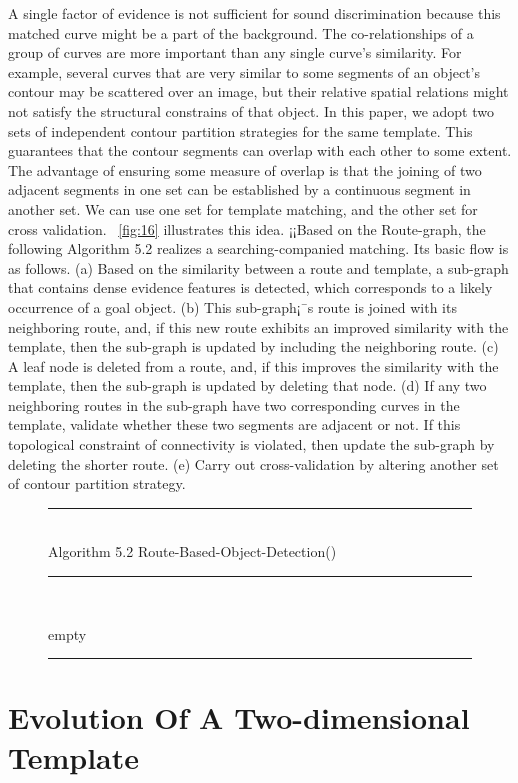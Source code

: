 \documentclass[journal]{IEEEtran}
\newenvironment{myalgorithm}[1]%
{\begin{figure}[!h]\small\noindent\rule{\linewidth}{1pt}\\#1\vspace{-0.5em}\\%
\rule{\linewidth}{0.5pt}\\\vspace{-1.5em}}%
{\vspace{-0.5em}\rule{\linewidth}{1pt}\end{figure}}
\begin{document}
A single factor of evidence is not sufficient for sound discrimination because this matched curve might be a part of the background. 
The co-relationships of a group of curves are more important than any single curve's similarity. 
For example, several curves that are very similar to some segments of an object's contour may be scattered over an image, but their relative spatial relations might not satisfy the structural constrains of that object. 
In this paper, we adopt two sets of independent contour partition strategies for the same template. This guarantees that the contour segments can overlap with each other to some extent. The advantage of ensuring some measure of overlap is that the joining of two adjacent segments in one set can be established by a continuous segment in another set.
We can use one set for template matching, and the other set for cross validation. 
\figurename~\ref{fig:16} illustrates this idea.
¡¡Based on the Route-graph, the following Algorithm 5.2 realizes a searching-companied matching. 
Its basic flow is as follows. 
(a) Based on the similarity between a route and template, 
a sub-graph that contains dense evidence features is detected, 
which corresponds to a likely occurrence of a goal object. 
(b) This sub-graph¡¯s route is joined with its neighboring route, 
and, if this new route exhibits an improved similarity with the template, 
then the sub-graph is updated by including the neighboring route. 
(c) A leaf node is deleted from a route, 
and, if this improves the similarity with the template, 
then the sub-graph is updated by deleting that node. 
(d) If any two neighboring routes in the sub-graph have two corresponding curves in the template, 
validate whether these two segments are adjacent or not. 
If this topological constraint of connectivity is violated, 
then update the sub-graph by deleting the shorter route. 
(e) Carry out cross-validation by altering another set of contour partition strategy.

\begin{myalgorithm}{Algorithm 5.2 Route-Based-Object-Detection()}
\begin{algorithmic}[1]
\STATE empty
\end{algorithmic}
\end{myalgorithm}

\section{Evolution Of A Two-dimensional Template}
\end{document}
